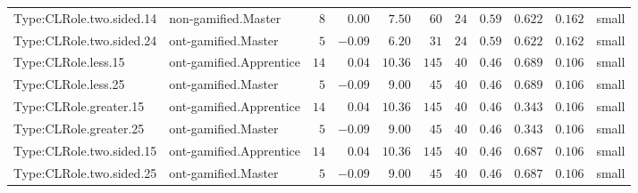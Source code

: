 \documentclass[6pt,a4paper]{article}
\begin{document}
{\begin{longtable}{llrrrrrrrrl}
Type:CLRole.two.sided.14&non-gamified.Master&$ 8$&$ 0.00$&$ 7.50$&$ 60$&$ 24$&$ 0.59$&$0.622$&$0.162$&small\tabularnewline
Type:CLRole.two.sided.24&ont-gamified.Master&$ 5$&$-0.09$&$ 6.20$&$ 31$&$ 24$&$ 0.59$&$0.622$&$0.162$&small\tabularnewline
Type:CLRole.less.15&ont-gamified.Apprentice&$14$&$ 0.04$&$10.36$&$145$&$ 40$&$ 0.46$&$0.689$&$0.106$&small\tabularnewline
Type:CLRole.less.25&ont-gamified.Master&$ 5$&$-0.09$&$ 9.00$&$ 45$&$ 40$&$ 0.46$&$0.689$&$0.106$&small\tabularnewline
Type:CLRole.greater.15&ont-gamified.Apprentice&$14$&$ 0.04$&$10.36$&$145$&$ 40$&$ 0.46$&$0.343$&$0.106$&small\tabularnewline
Type:CLRole.greater.25&ont-gamified.Master&$ 5$&$-0.09$&$ 9.00$&$ 45$&$ 40$&$ 0.46$&$0.343$&$0.106$&small\tabularnewline
\newpage
Type:CLRole.two.sided.15&ont-gamified.Apprentice&$14$&$ 0.04$&$10.36$&$145$&$ 40$&$ 0.46$&$0.687$&$0.106$&small\tabularnewline
Type:CLRole.two.sided.25&ont-gamified.Master&$ 5$&$-0.09$&$ 9.00$&$ 45$&$ 40$&$ 0.46$&$0.687$&$0.106$&small\tabularnewline
\hline
\end{longtable}}
\end{document}
